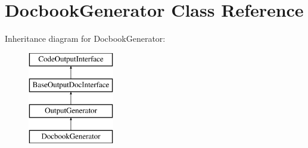\hypertarget{class_docbook_generator}{}\section{Docbook\+Generator Class Reference}
\label{class_docbook_generator}
Inheritance diagram for Docbook\+Generator\+:\begin{figure}[H]
\begin{center}
\leavevmode
\includegraphics[height=4.000000cm]{class_docbook_generator}
\end{center}
\end{figure}
